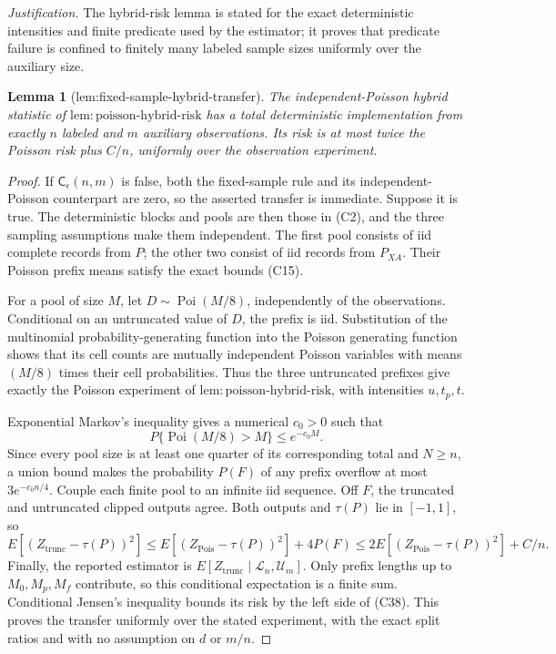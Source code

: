 \documentclass{article}
\newtheorem{lemma}{Lemma}
\begin{document}
\par\smallskip\noindent \textit{Justification.} The hybrid-risk lemma is stated for the exact deterministic intensities and finite predicate used by the estimator; it proves that predicate failure is confined to finitely many labeled sample sizes uniformly over the auxiliary size.

\begin{lemma}[lem:fixed-sample-hybrid-transfer]\label{lem:fixed-sample-hybrid-transfer}
The independent-Poisson hybrid statistic of \(\mathrm{lem:poisson\mbox{-}hybrid\mbox{-}risk}\) has a total deterministic implementation from exactly \(n\) labeled and \(m\) auxiliary observations.  Its risk is at most twice the Poisson risk plus \(C/n\), uniformly over the observation experiment.
\end{lemma}
\begin{proof}
If \(\mathsf C_\epsilon(n,m)\) is false, both the fixed-sample rule and its independent-Poisson counterpart are zero, so the asserted transfer is immediate.  Suppose it is true.  The deterministic blocks and pools are then those in (C2), and the three sampling assumptions make them independent.  The first pool consists of iid complete records from \(P\); the other two consist of iid records from \(P_{XA}\).  Their Poisson prefix means satisfy the exact bounds (C15).

For a pool of size \(M\), let \(D\sim\operatorname{Poi}(M/8)\), independently of the observations.  Conditional on an untruncated value of \(D\), the prefix is iid.  Substitution of the multinomial probability-generating function into the Poisson generating function shows that its cell counts are mutually independent Poisson variables with means \((M/8)\) times their cell probabilities.  Thus the three untruncated prefixes give exactly the Poisson experiment of \(\mathrm{lem:poisson\mbox{-}hybrid\mbox{-}risk}\), with intensities \(u,t_p,t\).

Exponential Markov's inequality gives a numerical \(c_0>0\) such that
\[
 P\{\operatorname{Poi}(M/8)>M\}\le e^{-c_0M}.                     \tag{C37}
\]
Since every pool size is at least one quarter of its corresponding total and \(N\ge n\), a union bound makes the probability \(P(F)\) of any prefix overflow at most \(3e^{-c_0n/4}\).  Couple each finite pool to an infinite iid sequence.  Off \(F\), the truncated and untruncated clipped outputs agree.  Both outputs and \(\tau(P)\) lie in \([-1,1]\), so
\[
 E[(Z_{\mathrm{trunc}}-\tau(P))^2]
 \le E[(Z_{\mathrm{Pois}}-\tau(P))^2]+4P(F)
 \le2E[(Z_{\mathrm{Pois}}-\tau(P))^2]+C/n.                        \tag{C38}
\]
Finally, the reported estimator is \(E[Z_{\mathrm{trunc}}\mid\mathcal L_n,\mathcal U_m]\).  Only prefix lengths up to \(M_0,M_p,M_f\) contribute, so this conditional expectation is a finite sum.  Conditional Jensen's inequality bounds its risk by the left side of (C38).  This proves the transfer uniformly over the stated experiment, with the exact split ratios and with no assumption on \(d\) or \(m/n\).
\end{proof}
\end{document}
